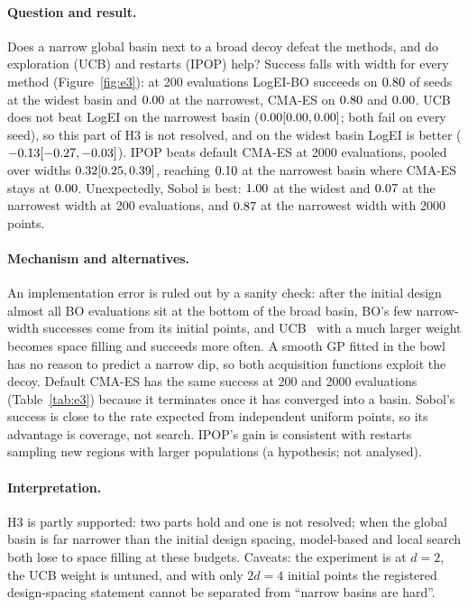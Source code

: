 \documentclass[10pt,a4paper,twocolumn]{article}
\begin{document}
\paragraph{Question and result.}
Does a narrow global basin next to a broad decoy defeat the methods, and do exploration (UCB) and restarts (IPOP) help?
Success falls with width for every method (Figure~\ref{fig:e3}): at 200 evaluations LogEI-BO succeeds on
$0.80$ of seeds at the widest basin and $0.00$ at the narrowest, CMA-ES
on $0.80$ and $0.00$. UCB does not beat LogEI on the narrowest basin ($0.00 [0.00, 0.00]$; both fail
on every seed), so this part of H3 is not resolved, and on the widest basin LogEI is better
($-0.13 [-0.27, -0.03]$). IPOP beats default CMA-ES at 2000 evaluations, pooled over widths
$0.32 [0.25, 0.39]$, reaching $0.10$ at the narrowest basin where CMA-ES stays at
$0.00$. Unexpectedly, Sobol is best: $1.00$ at the widest and
$0.07$ at the narrowest width at 200 evaluations, and $0.87$ at the
narrowest width with 2000 points.

\paragraph{Mechanism and alternatives.}
An implementation error is ruled out by a sanity check: after the initial design almost all BO evaluations sit at the
bottom of the broad basin, BO's few narrow-width successes come from its initial points, and UCB~\citep{srinivas2010gpucb} with a much larger
weight becomes space filling and succeeds more often. A smooth GP fitted in the bowl has no reason to predict a narrow
dip, so both acquisition functions exploit the decoy. Default CMA-ES has the same success at 200 and 2000 evaluations
(Table~\ref{tab:e3}) because it terminates once it has converged into a basin.
Sobol's success is close to the rate expected from independent uniform points, so its advantage is coverage, not search.
IPOP's gain is consistent with restarts sampling new regions with larger populations (a hypothesis; not analysed).

\paragraph{Interpretation.}
H3 is partly supported: two parts hold and one is not resolved; when the global basin is far narrower than the initial
design spacing, model-based and local search both lose to space filling at these budgets.
Caveats: the experiment is at $d=2$, the UCB weight is untuned, and with only $2d=4$ initial points the
registered design-spacing statement cannot be separated from ``narrow basins are hard''.
\end{document}
